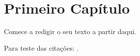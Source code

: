 \chapter{Primeiro Capítulo}
\label{cap1}

Comece a redigir o seu texto a partir daqui.

Para teste das citações: .
